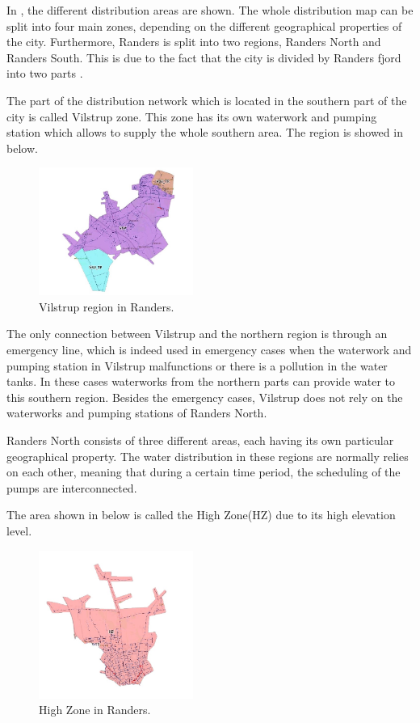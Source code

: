 In , the different distribution areas are shown. The whole distribution map can be split into four main zones, depending on the different geographical properties of the city. Furthermore, Randers is split into two regions, Randers North and Randers South. This is due to the fact that the city is divided by Randers fjord into two parts\cite{verdo} . 

The part of the distribution network which is located in the southern part of the city is called Vilstrup zone. This zone has its own waterwork and pumping station which allows to supply the whole southern area. The region is showed in  below.

\begin{figure}[H]
\centering
\includegraphics[width=0.45\textwidth]{report/pictures/Vilstrup_region}
\caption{Vilstrup region in Randers.}
\label{fig:vilstrup_region}
\end{figure}

The only connection between Vilstrup and the northern region is through an emergency line, which is indeed used in emergency cases when the waterwork and pumping station in Vilstrup malfunctions or there is a pollution in the water tanks. In these cases waterworks from the northern parts can provide water to this southern region. Besides the emergency cases, Vilstrup does not rely on the waterworks and pumping stations of Randers North.  

Randers North consists of three different areas, each having its own particular geographical property. The water distribution in these regions are normally relies on each other, meaning that during a certain time period, the scheduling of the pumps are interconnected. 

The area shown in  below is called the High Zone(HZ) due to its high elevation level. 

\begin{figure}[H]
\centering
\includegraphics[width=0.45\textwidth]{report/pictures/Highzone_region}
\caption{High Zone in Randers.}
\label{fig:highzone_region}
\end{figure}

